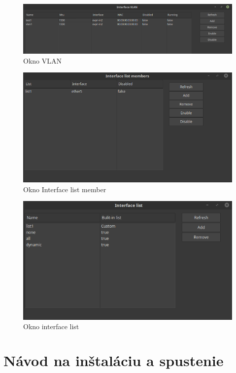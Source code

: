 \begin{figure}[H]
\centering
\includegraphics[scale=0.35]{../text/vlangui.png}
\caption{Okno VLAN}
\label{fig:vlangui}
\end{figure}
\begin{figure}[H]
\centering
\includegraphics[scale=0.35]{../text/ifacelistmember.png}
\caption{Okno Interface list member}
\label{fig:interfacelistmembergui}
\end{figure}
\begin{figure}[H]
\centering
\includegraphics[scale=0.45]{../text/ifacelist.png}
\caption{Okno interface list}
\label{fig:interfacelistgui}
\end{figure}
\chapter{Návod na inštaláciu a spustenie}
